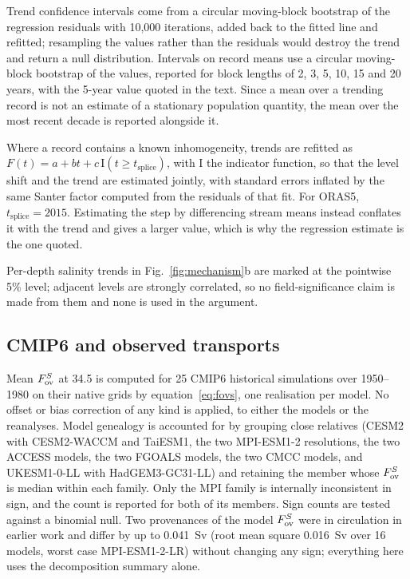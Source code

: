 Trend confidence intervals come from a circular moving-block bootstrap of the
regression residuals with 10{,}000 iterations, added back to the fitted line and
refitted; resampling the values rather than the residuals would destroy the
trend and return a null distribution. Intervals on record means use a circular
moving-block bootstrap of the values, reported for block lengths of 2, 3, 5, 10,
15 and 20 years, with the 5-year value quoted in the text. Since a mean over a
trending record is not an estimate of a stationary population quantity, the mean
over the most recent decade is reported alongside it.

Where a record contains a known inhomogeneity, trends are refitted as
$F(t)=a+bt+c\,\mathrm{I}(t\ge t_{\text{splice}})$, with $\mathrm{I}$ the
indicator function, so that the level shift and
the trend are estimated jointly, with standard errors inflated by the same
Santer factor computed from the residuals of that fit. For ORAS5,
$t_{\text{splice}}=2015$. Estimating the step by differencing stream means
instead conflates it with the trend and gives a larger value, which is why the
regression estimate is the one quoted.

Per-depth salinity trends in Fig.~\ref{fig:mechanism}b are marked at the
pointwise 5\% level; adjacent levels are strongly correlated, so no
field-significance claim is made from them and none is used in the argument.

\subsection*{CMIP6 and observed transports}

Mean $F_{\mathrm{ov}}^{S}$ at 34.5\degS{} is computed for 25 CMIP6\cite{Eyring2016}
historical simulations over 1950--1980 on their native grids by
equation~\eqref{eq:fovs}, one realisation per model. No offset or bias
correction of any kind is applied, to either the models or the reanalyses. Model
genealogy is accounted for by grouping close relatives (CESM2 with CESM2-WACCM
and TaiESM1, the two MPI-ESM1-2 resolutions, the two ACCESS models, the two
FGOALS models, the two CMCC models, and UKESM1-0-LL with HadGEM3-GC31-LL) and
retaining the member whose $F_{\mathrm{ov}}^{S}$ is median within each family. Only the MPI
family is internally inconsistent in sign, and the count is reported for both of
its members. Sign counts are tested against a binomial null. Two provenances of the model
$F_{\mathrm{ov}}^{S}$ were in circulation in earlier work and differ by up to 0.041~Sv (root
mean square 0.016~Sv over 16 models, worst case MPI-ESM1-2-LR) without changing
any sign; everything here uses the decomposition summary alone.

